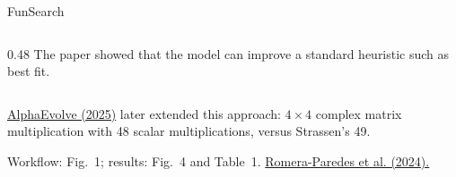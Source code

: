 \documentclass[11pt,aspectratio=169]{beamer}
\begin{document}
\begin{frame}[t]{FunSearch}
\begin{columns}[T,onlytextwidth]
\begin{column}{0.48\textwidth}
      The paper showed that the model can improve a standard heuristic such as best fit.
    \end{column}
  \end{columns}
  \vspace{1mm}
  {\fontsize{8}{9.5}\selectfont
    \href{https://arxiv.org/abs/2506.13131}{AlphaEvolve (2025)}
    later extended this approach: $4\times4$ complex matrix multiplication
    with 48 scalar multiplications, versus Strassen's 49.\par}
  \vspace{0.5mm}
  {\fontsize{6.8}{8}\selectfont%
    Workflow: Fig.~1; results: Fig.~4 and Table~1.
    \href{https://doi.org/10.1038/s41586-023-06924-6}{Romera-Paredes et al. (2024).}\par}
\end{frame}
\end{document}
